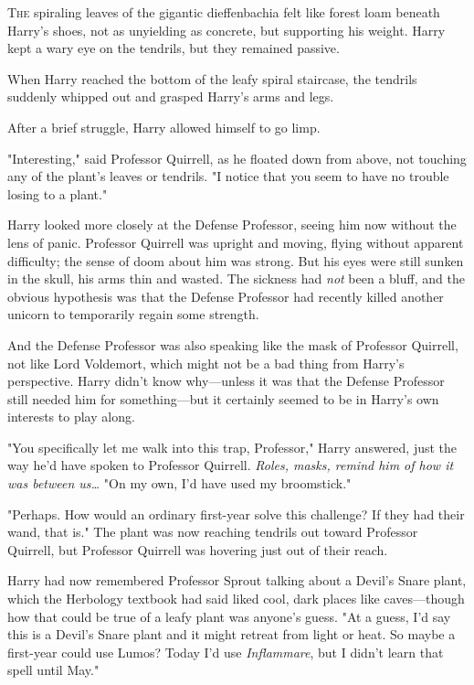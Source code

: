 
\lettrine{T}{he} spiraling
leaves of the gigantic dieffenbachia felt like forest loam beneath Harry's
shoes, not as unyielding as concrete, but supporting his weight. Harry kept a
wary eye on the tendrils, but they remained passive.

When Harry reached the bottom of the leafy spiral staircase, the tendrils
suddenly whipped out and grasped Harry's arms and legs.

After a brief struggle, Harry allowed himself to go limp.

"Interesting," said Professor Quirrell, as he floated down from above, not
touching any of the plant's leaves or tendrils. "I notice that you seem to have
no trouble losing to a plant."

Harry looked more closely at the Defense Professor, seeing him now without the
lens of panic. Professor Quirrell was upright and moving, flying without
apparent difficulty; the sense of doom about him was strong. But his eyes were
still sunken in the skull, his arms thin and wasted. The sickness had
\emph{not} been a bluff, and the obvious hypothesis was that the Defense
Professor had recently killed another unicorn to temporarily regain some
strength.

And the Defense Professor was also speaking like the mask of Professor
Quirrell, not like Lord Voldemort, which might not be a bad thing from Harry's
perspective. Harry didn't know why---unless it was that the Defense Professor
still needed him for something---but it certainly seemed to be in Harry's own
interests to play along.

"You specifically let me walk into this trap, Professor," Harry answered, just
the way he'd have spoken to Professor Quirrell. \emph{Roles, masks, remind him
of how it was between us{\ldots}} "On my own, I'd have used my broomstick."

"Perhaps. How would an ordinary first-year solve this challenge? If they had
their wand, that is." The plant was now reaching tendrils out toward Professor
Quirrell, but Professor Quirrell was hovering just out of their reach.

Harry had now remembered Professor Sprout talking about a Devil's Snare plant,
which the Herbology textbook had said liked cool, dark places like
caves---though how that could be true of a leafy plant was anyone's guess. "At
a guess, I'd say this is a Devil's Snare plant and it might retreat from light
or heat. So maybe a first-year could use Lumos? Today I'd use
\emph{Inflammare}, but I didn't learn that spell until May."

